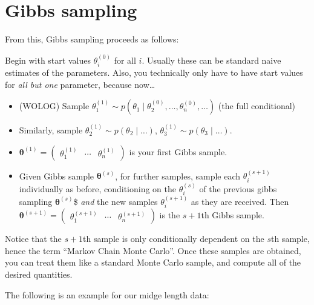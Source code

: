 \documentclass[]{article}
\providecommand{\tightlist}{%
  \setlength{\itemsep}{0pt}\setlength{\parskip}{0pt}}
\begin{document}
\hypertarget{gibbs-sampling}{%
\section{Gibbs sampling}\label{gibbs-sampling}}

From this, Gibbs sampling proceeds as follows:

Begin with start values \(\theta_i^{(0)}\) for all \(i\). Usually these
can be standard naive estimates of the parameters. Also, you technically
only have to have start values for \emph{all but one} parameter, because
now\ldots{}

\begin{itemize}
\tightlist
\item
  (WOLOG) Sample
  \(\theta_1^{(1)} \sim p(\theta_1 \mid \theta_2^{(0)}, \dots, \theta_n^{(0)}, \dots)\)
  (the full conditional)
\item
  Similarly, sample \(\theta_2^{(1)} \sim p(\theta_2 \mid \dots)\),
  \(\theta_3^{(1)} \sim p(\theta_3 \mid \dots)\).
\item
  \(\boldsymbol{\theta}^{(1)} = \begin{pmatrix} \theta_1^{(1)} & \cdots & \theta_n^{(1)} \end{pmatrix}\)
  is your first Gibbs sample.
\item
  Given Gibbs sample \(\boldsymbol{\theta}^{(s)}\), for further samples,
  sample each \(\theta_i^{(s + 1)}\) individually as before,
  conditioning on the \(\theta_i^{(s)}\) of the previous gibbs sampling
  \(\boldsymbol{\theta}^{(s)}\)\$ \emph{and} the new samples
  \(\theta_i^{(s + 1)}\) as they are received. Then
  \(\boldsymbol{\theta}^{(s + 1)} = \begin{pmatrix} \theta_1^{(s + 1)} & \cdots & \theta_n^{(s + 1)} \end{pmatrix}\)
  is the \(s + 1\)th Gibbs sample.
\end{itemize}

Notice that the \(s + 1\)th sample is only conditionally dependent on
the \(s\)th sample, hence the term ``Markov Chain Monte Carlo''. Once
these samples are obtained, you can treat them like a standard Monte
Carlo sample, and compute all of the desired quantities.

The following is an example for our midge length data:
\end{document}
